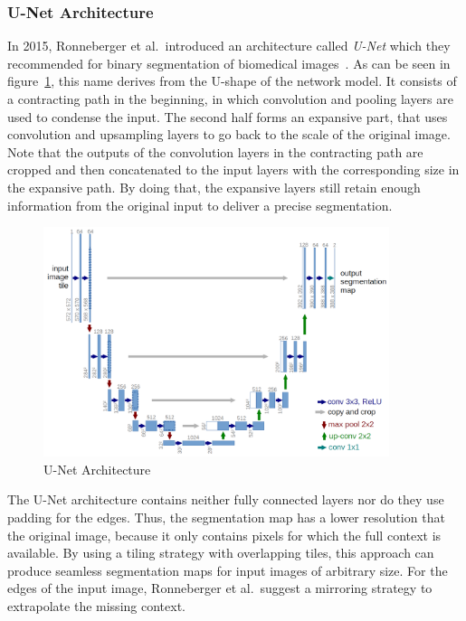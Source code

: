 \subsubsection{U-Net Architecture}
In 2015, Ronneberger et al.\ introduced an architecture called \emph{U-Net} which they recommended for binary segmentation of biomedical images~\cite{unet15}. As can be seen in figure~\ref{fig:unet_architecture}, this name derives from the U-shape of the network model. It consists of a contracting path in the beginning, in which convolution and pooling layers are used to condense the input. The second half forms an expansive part, that uses convolution and upsampling layers to go back to the scale of the original image. Note that the outputs of the convolution layers in the contracting path are cropped and then concatenated to the input layers with the corresponding size in the expansive path. By doing that, the expansive layers still retain enough information from the original input to deliver a precise segmentation.

\begin{figure}[h]
    \centering
    \includegraphics[width=0.9\textwidth]{images/u-net-architecture}
    \caption{U-Net Architecture \cite{unet15}}
    \label{fig:unet_architecture}
\end{figure}

The U-Net architecture contains neither fully connected layers nor do they use padding for the edges. Thus, the segmentation map has a lower resolution that the original image, because it only contains pixels for which the full context is available. By using a tiling strategy with overlapping tiles, this approach can produce seamless segmentation maps for input images of arbitrary size. For the edges of the input image, Ronneberger et al.\ suggest a mirroring strategy to extrapolate the missing context.~\cite{unet15}


